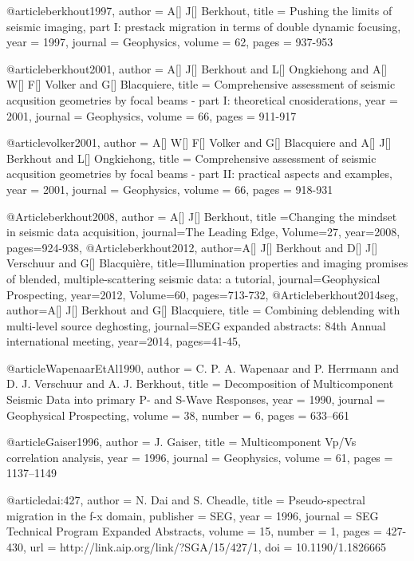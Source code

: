 @article{berkhout1997,
  author =	 {A[] J[] Berkhout},
  title =	 {Pushing the limits of seismic imaging, part I: prestack migration in terms of double dynamic focusing},
  year =	 1997,
  journal =	 {Geophysics},
  volume =	 62,
  pages =	 {937-953}
}

@article{berkhout2001,
  author =	 {A[] J[] Berkhout and L[] Ongkiehong and A[] W[] F[] Volker and G[] Blacquiere},
  title =	 {Comprehensive assessment of seismic acqusition geometries by focal beams - part {I}: theoretical cnosiderations},
  year =	 2001,
  journal =	 {Geophysics},
  volume =	 66,
  pages =	 {911-917}
}

@article{volker2001,
  author =	 {A[] W[] F[] Volker and G[] Blacquiere and A[] J[] Berkhout and L[] Ongkiehong},
  title =	 {Comprehensive assessment of seismic acqusition geometries by focal beams - part {II}: practical aspects and examples},
  year =	 2001,
  journal =	 {Geophysics},
  volume =	 66,
  pages =	 {918-931}
}

@Article{berkhout2008,
  author = {A[] J[] Berkhout},
  title ={Changing the mindset in seismic data acquisition},
  journal={The Leading Edge},
  Volume=27,
  year=2008,
  pages={924-938},
}
@Article{berkhout2012,
  author={A[] J[] Berkhout and D[] J[] Verschuur and G[] Blacqui\`{e}re},
  title={Illumination properties and imaging promises of blended, multiple-scattering seismic data: a tutorial},
  journal={Geophysical Prospecting},
  year=2012,
  Volume=60,
  pages={713-732},
}
@Article{berkhout2014seg,
  author={A[] J[] Berkhout and G[] Blacquiere},
  title = {Combining deblending with multi-level source deghosting},
  journal={SEG expanded abstracts: 84th Annual international meeting},
  year=2014,
  pages={41-45},
}

@article{WapenaarEtAl1990,
  author =	 {C. P. A. Wapenaar and P. Herrmann and
                  D. J. Verschuur and A. J. Berkhout},
  title =	 {Decomposition of Multicomponent Seismic Data into
                  primary {P}- and {S}-Wave Responses},
  year =	 1990,
  journal =	 {Geophysical Prospecting},
  volume =	 38,
  number =	 6,
  pages =	 {633--661}
}



@article{Gaiser1996,
  author =	 {J. Gaiser},
  title =	 {Multicomponent {V}p/{V}s correlation analysis},
  year =	 1996,
  journal =	 {Geophysics},
  volume =	 61,
  pages =	 {1137--1149}
}

@article{dai:427,
  author =	 {N. Dai and S. Cheadle},
  title =	 {Pseudo-spectral migration in the f-x domain},
  publisher =	 {SEG},
  year =	 1996,
  journal =	 {SEG Technical Program Expanded Abstracts},
  volume =	 15,
  number =	 1,
  pages =	 {427-430},
  url =		 {http://link.aip.org/link/?SGA/15/427/1},
  doi =		 {10.1190/1.1826665}
}

